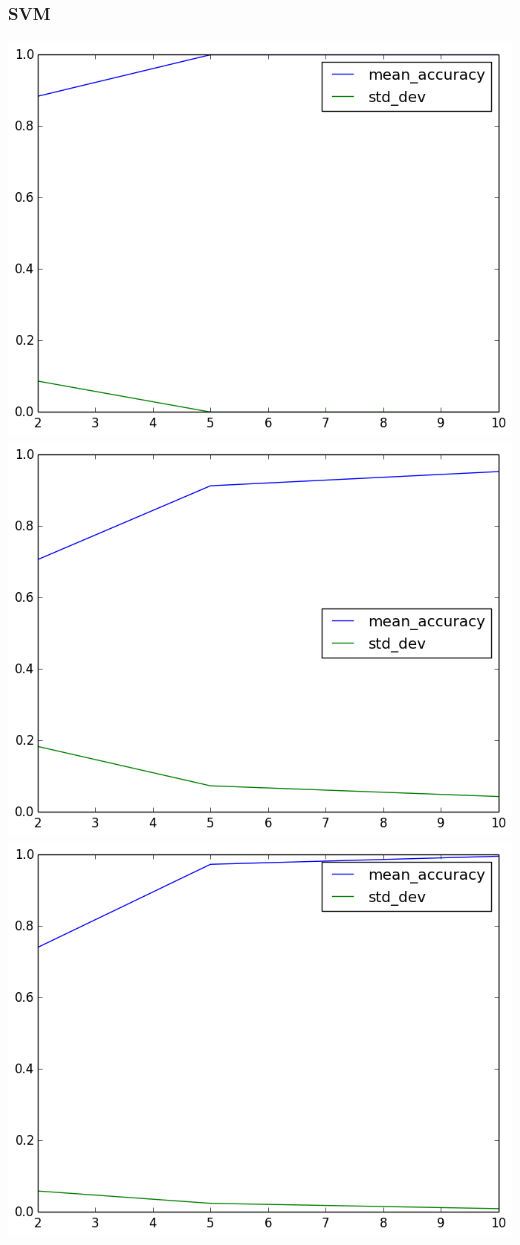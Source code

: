 \documentclass[fleqn]{article}
\begin{document}
    \subsubsection{SVM}
    \begin{center}
        \includegraphics[scale=0.3]{model_accuracy_vs_folds_SVM-linear.png}
        \includegraphics[scale=0.3]{model_accuracy_vs_folds_SVM-poly.png}
        \includegraphics[scale=0.3]{model_accuracy_vs_folds_SVM-rbf.png}

\end{center}
\end{document}
